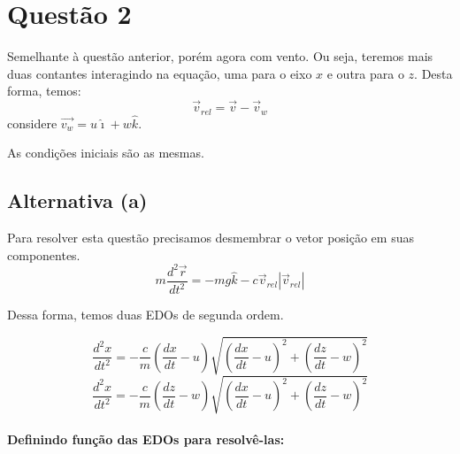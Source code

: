 \documentclass[12pt, a4paper]{article}
\begin{document}
    \hypertarget{questuxe3o-2}{%
\section{Questão 2}\label{questuxe3o-2}}

Semelhante à questão anterior, porém agora com vento. Ou seja, teremos
mais duas contantes interagindo na equação, uma para o eixo \(x\) e
outra para o \(z\). Desta forma, temos:
\[\vec{v}_{rel} =\vec{v} - \vec{v}_w \] considere
\(\vec{v_w} = u\hat{\imath} + w\hat{k}\).

As condições iniciais são as mesmas.

\hypertarget{alternativa-a}{%
\subsection{Alternativa (a)}\label{alternativa-a}}

Para resolver esta questão precisamos desmembrar o vetor posição em suas
componentes.
\[ m \frac{d^2\vec{r}}{dt^2} =-mg\hat{k} - c\vec{v}_{rel}|\vec{v}_{rel}|\]

Dessa forma, temos duas EDOs de segunda ordem.

\[ \frac{d^2x}{dt^2} = - \frac{c}{m} \left(\frac{dx}{dt}-u\right) \sqrt{\left(\frac{dx}{dt}-u \right)^2 + \left(\frac{dz}{dt} - w \right)^2}
\]
\[ \frac{d^2x}{dt^2} = - \frac{c}{m} \left(\frac{dz}{dt}-w\right) \sqrt{\left(\frac{dx}{dt}-u \right)^2 + \left(\frac{dz}{dt} - w \right)^2}
\]

    \hypertarget{definindo-funuxe7uxe3o-das-edos-para-resolvuxea-las}{%
\paragraph{Definindo função das EDOs para
resolvê-las:}\label{definindo-funuxe7uxe3o-das-edos-para-resolvuxea-las}}
\end{document}
